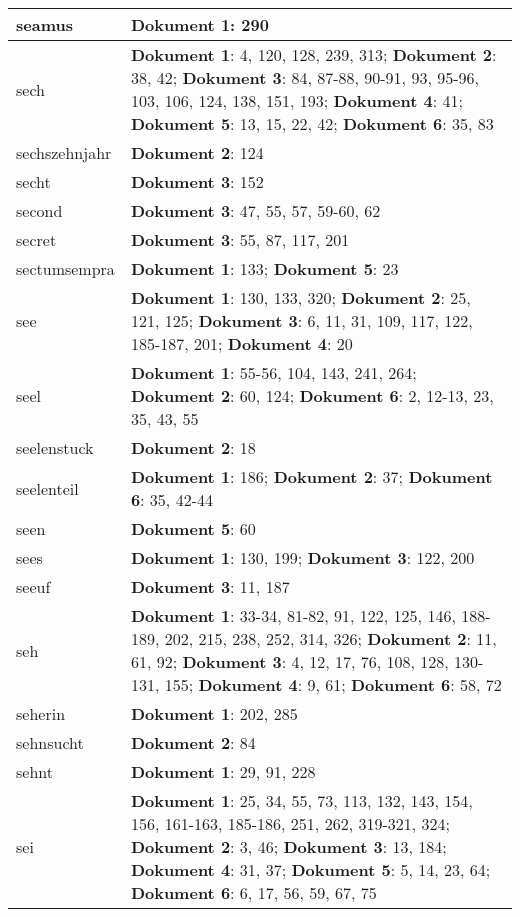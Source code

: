 \documentclass[a5paper]{article}
\begin{document}
\begin{longtable}[l]{|l|p{3in}|}
\hline
seamus & \textbf{Dokument 1}: 290 \\
\hline
sech & \textbf{Dokument 1}: 4, 120, 128, 239, 313; \textbf{Dokument 2}: 38, 42; \textbf{Dokument 3}: 84, 87-88, 90-91, 93, 95-96, 103, 106, 124, 138, 151, 193; \textbf{Dokument 4}: 41; \textbf{Dokument 5}: 13, 15, 22, 42; \textbf{Dokument 6}: 35, 83 \\
\hline
sechszehnjahr & \textbf{Dokument 2}: 124 \\
\hline
secht & \textbf{Dokument 3}: 152 \\
\hline
second & \textbf{Dokument 3}: 47, 55, 57, 59-60, 62 \\
\hline
secret & \textbf{Dokument 3}: 55, 87, 117, 201 \\
\hline
sectumsempra & \textbf{Dokument 1}: 133; \textbf{Dokument 5}: 23 \\
\hline
see & \textbf{Dokument 1}: 130, 133, 320; \textbf{Dokument 2}: 25, 121, 125; \textbf{Dokument 3}: 6, 11, 31, 109, 117, 122, 185-187, 201; \textbf{Dokument 4}: 20 \\
\hline
seel & \textbf{Dokument 1}: 55-56, 104, 143, 241, 264; \textbf{Dokument 2}: 60, 124; \textbf{Dokument 6}: 2, 12-13, 23, 35, 43, 55 \\
\hline
seelenstuck & \textbf{Dokument 2}: 18 \\
\hline
seelenteil & \textbf{Dokument 1}: 186; \textbf{Dokument 2}: 37; \textbf{Dokument 6}: 35, 42-44 \\
\hline
seen & \textbf{Dokument 5}: 60 \\
\hline
sees & \textbf{Dokument 1}: 130, 199; \textbf{Dokument 3}: 122, 200 \\
\hline
seeuf & \textbf{Dokument 3}: 11, 187 \\
\hline
seh & \textbf{Dokument 1}: 33-34, 81-82, 91, 122, 125, 146, 188-189, 202, 215, 238, 252, 314, 326; \textbf{Dokument 2}: 11, 61, 92; \textbf{Dokument 3}: 4, 12, 17, 76, 108, 128, 130-131, 155; \textbf{Dokument 4}: 9, 61; \textbf{Dokument 6}: 58, 72 \\
\hline
seherin & \textbf{Dokument 1}: 202, 285 \\
\hline
sehnsucht & \textbf{Dokument 2}: 84 \\
\hline
sehnt & \textbf{Dokument 1}: 29, 91, 228 \\
\hline
sei & \textbf{Dokument 1}: 25, 34, 55, 73, 113, 132, 143, 154, 156, 161-163, 185-186, 251, 262, 319-321, 324; \textbf{Dokument 2}: 3, 46; \textbf{Dokument 3}: 13, 184; \textbf{Dokument 4}: 31, 37; \textbf{Dokument 5}: 5, 14, 23, 64; \textbf{Dokument 6}: 6, 17, 56, 59, 67, 75 \\

\end{longtable}
\end{document}
